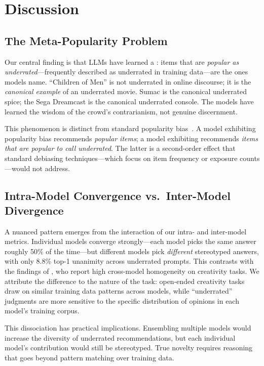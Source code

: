 \section{Discussion}
\label{sec:discussion}

\subsection{The Meta-Popularity Problem}
\label{sec:metapop}

Our central finding is that LLMs have learned a \metapop: items that are \emph{popular as underrated}---frequently described as underrated in training data---are the ones models name. ``Children of Men'' is not underrated in online discourse; it is the \emph{canonical example} of an underrated movie. Sumac is the canonical underrated spice; the Sega Dreamcast is the canonical underrated console. The models have learned the wisdom of the crowd's contrarianism, not genuine discernment.

This phenomenon is distinct from standard popularity bias~\cite{lichtenberg2024popularity}. A model exhibiting popularity bias recommends \emph{popular items}; a model exhibiting \metapop recommends \emph{items that are popular to call underrated}. The latter is a second-order effect that standard debiasing techniques---which focus on item frequency or exposure counts---would not address.

\subsection{Intra-Model Convergence vs.\ Inter-Model Divergence}
\label{sec:intra_inter}

A nuanced pattern emerges from the interaction of our intra- and inter-model metrics. Individual models converge strongly---each model picks the same answer roughly 50\% of the time---but different models pick \emph{different} stereotyped answers, with only 8.8\% top-1 unanimity across underrated prompts. This contrasts with the findings of \citet{wenger2025creative}, who report high cross-model homogeneity on creativity tasks. We attribute the difference to the nature of the task: open-ended creativity tasks draw on similar training data patterns across models, while ``underrated'' judgments are more sensitive to the specific distribution of opinions in each model's training corpus.

This dissociation has practical implications. Ensembling multiple models would increase the diversity of underrated recommendations, but each individual model's contribution would still be stereotyped. True novelty requires reasoning that goes beyond pattern matching over training data.

